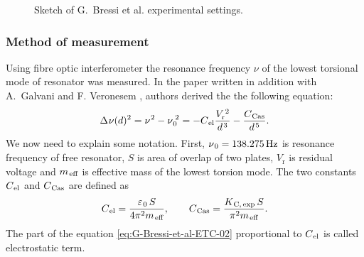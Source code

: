 \documentclass[10pt,t]{beamer}
\begin{document}
\begin{frame}
\begin{figure}

    \caption{Sketch of G.~Bressi et al. experimental settings.}

  \end{figure}

\end{frame}





\begin{frame}
  \frametitle{Method of measurement}


  Using fibre optic interferometer the resonance frequency $\nu$ of
  the lowest torsional mode of resonator was measured. In the paper
  written in addition with A.~Galvani and F. Veronesem
  \parencite{Bressi-et-al-Experimental-studies-of-macroscopic-ETC-Pub-2001},
  authors derived the the following equation:
  \begin{equation}
    \label{eq:G-Bressi-et-al-ETC-02}
    \Delta \HorSpaceOne \nu( d )^{ 2 } =
    \nu^{ \HorSpaceOne 2 } - \nu_{ \HorSpaceTwo 0 }^{ \; 2 } =
    -C_{ \HorSpaceTwo \text{el} } \frac{ V_{ \text{r} }^{ \, 2 } }{
      d^{ \HorSpaceThree 3 } } -
    \frac{ C_{ \HorSpaceTwo \text{Cas} } }{ d^{ \HorSpaceFour 5 } }.
  \end{equation}
  We now need to explain some notation. First,
  $\nu_{ \HorSpaceFour 0 } = 138.275 \, \si{Hz}$ is resonance frequency of
  free resonator, $S$ is area of overlap of two plates, $V_{ \text{r} }$ is
  residual voltage and $m_{ \HorSpaceThree \text{eff} }$ is effective mass of
  the lowest torsion mode. The two constants $C_{ \HorSpaceTwo \text{el} }$
  and $C_{ \HorSpaceTwo \text{Cas} }$ are defined as
  \begin{equation}
    \label{eq:G-Bressi-et-al-ETC-03}
    C_{ \HorSpaceTwo \text{el} } =
    \frac{ \varepsilon_{ \HorSpaceTwo 0 } \, S }{ 4 \pi^{ 2 }
      m_{ \HorSpaceThree \text{eff} } }, \qquad
    C_{ \HorSpaceTwo \text{Cas} } =
    \frac{ K_{ \HorSpaceTwo \text{C}, \, \text{exp} } \, S }{ \pi^{ 2 }
      m_{ \HorSpaceThree \text{eff} } }.
  \end{equation}
  The part of the equation \eqref{eq:G-Bressi-et-al-ETC-02}
  proportional to $C_{ \HorSpaceTwo \text{el} }$ is called electrostatic term.

\end{frame}
\end{document}
